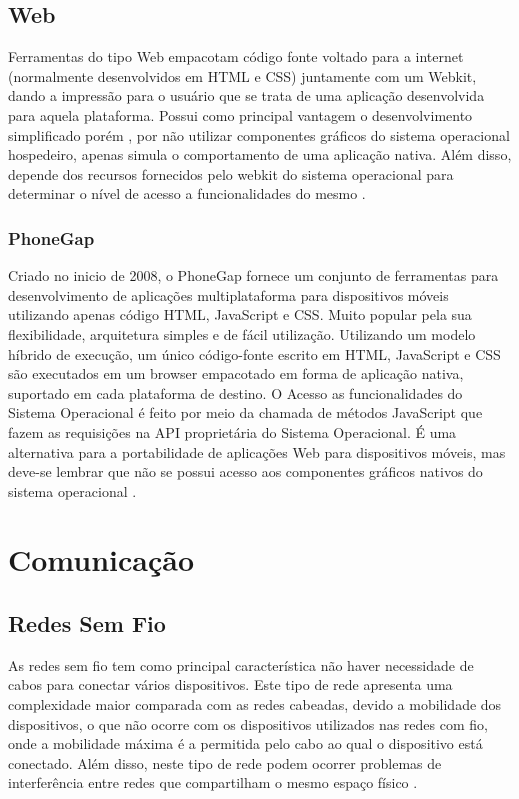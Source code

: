 \subsection{Web}
Ferramentas do tipo Web empacotam código fonte voltado para a internet (normalmente desenvolvidos em HTML e CSS) juntamente com um Webkit, dando a impressão para o usuário que se trata de uma aplicação desenvolvida para aquela plataforma. Possui como principal vantagem o desenvolvimento simplificado porém , por não utilizar componentes gráficos do sistema operacional hospedeiro, apenas simula o comportamento de uma aplicação nativa. Além disso, depende dos recursos fornecidos pelo webkit do sistema operacional para determinar o nível de acesso a funcionalidades do mesmo 
\cite{CrossPlatformMobileDevelopment2011}.

\subsubsection{PhoneGap}
Criado no inicio de 2008, o PhoneGap fornece um conjunto de ferramentas para desenvolvimento de aplicações multiplataforma para dispositivos móveis utilizando apenas código HTML, JavaScript e CSS. Muito popular pela sua flexibilidade, arquitetura simples e de fácil utilização. Utilizando um modelo híbrido de execução, um único código-fonte escrito em HTML, JavaScript e CSS são executados em um browser empacotado em forma de aplicação nativa, suportado em cada plataforma de destino. O Acesso as funcionalidades do Sistema Operacional é feito por meio da chamada de métodos JavaScript que fazem as requisições na API proprietária do Sistema Operacional. É uma alternativa para a portabilidade de aplicações Web para dispositivos móveis, mas deve-se lembrar que não se possui acesso aos componentes gráficos nativos do sistema operacional
\cite{CrossPlatformMobileDevelopment2011}.

\section{Comunicação}

\subsection{Redes Sem Fio}
As redes sem fio tem como principal característica não haver necessidade de cabos para conectar vários dispositivos. Este tipo de rede apresenta uma complexidade maior comparada com as redes cabeadas, devido a mobilidade dos dispositivos, o que não ocorre com os dispositivos utilizados nas redes com fio, onde a mobilidade máxima é a permitida pelo cabo ao qual o dispositivo está conectado. Além disso, neste tipo de rede podem ocorrer problemas de interferência entre redes que compartilham o mesmo espaço físico 
\cite{IEEE80211}.

